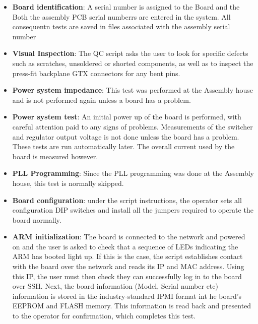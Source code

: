 \documentclass[11pt,article]{memoir}
\begin{document}
\begin{itemize}

	\item \textbf{Board identification}: A serial number is assigned to the Board and
	the Both the assembly PCB serial numberrs are entered in the system. All
	consequentn tests are saved in files associated with the assembly serial
	number

	\item \textbf{Visual Inspection}: The QC script asks the user to look for specific
	defects such as scratches, unsoldered or shorted components, as
	well as to inspect the press-fit backplane GTX connectors for any bent
	pins.

	\item \textbf{Power system impedance}: This test was performed at the Assembly house and is not performed again unless a board has a problem.

	\item \textbf{Power system test}: An initial power up of the board is
	performed, with careful attention paid to any signs of problems.
	Measurements of the switcher and regulator output voltage is not done
	unless the board has a problem. These tests are run automatically later.
	The overall current used by the board is measured however.

	\item \textbf{PLL Programming}:  Since the PLL programming was done at the Assembly house, this
	test is normally skipped.

	\item \textbf{Board configuration}: under the script instructions, the operator
	sets all configuration DIP switches and install all the jumpers required
	to operate the board normally.

	\item \textbf{ARM initialization}: The board is connected to the network and
	 powered on and the user is asked to check that a sequence of LEDs
	 indicating the ARM has booted light up. If this is the case, the script
	 establishes contact with the board over the network and reads its IP and
	 MAC address. Using this IP, the user must then check they can
	 successfully log in to the board over SSH. Next, the board information
	 (Model, Serial number etc) information is stored in the industry-standard
	 IPMI format int he board's EEPROM and FLASH memory. This information is
	 read back and presented to the operator for confirmation, which completes
	 this test.


\end{itemize}
\end{document}
